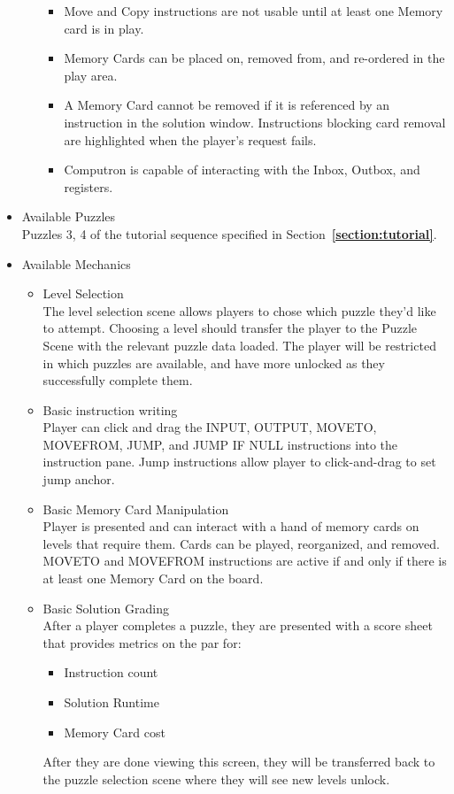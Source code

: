 \begin{itemize}
\begin{enumerate}
\begin{itemize}
			\item Move and Copy instructions are not usable until at least one 
			Memory card is in play.
			\item Memory Cards can be placed on, removed from, and re-ordered in 
			the play area.
			\item A Memory Card cannot be removed if it is referenced by an 
			instruction in the solution window. Instructions blocking card removal are 
			highlighted when the player's request fails.
			\item Computron is capable of interacting with the Inbox, Outbox, and registers.
		\end{itemize}
	\end{enumerate}
	\item Available Puzzles\\
	Puzzles 3, 4 of the tutorial sequence specified in Section~\textbf{\ref{section:tutorial}}.
	\item Available Mechanics
	\begin{itemize}
		\item Level Selection\\
		The level selection scene allows players to chose which puzzle they'd like to attempt. 
		Choosing a level should transfer the player to the Puzzle Scene with the relevant puzzle 
		data loaded. The player will be restricted in which puzzles are available, and have more unlocked as they successfully complete them.
		\item Basic instruction writing\\
		Player can click and drag the INPUT, OUTPUT, MOVETO, MOVEFROM, JUMP, and 
		JUMP IF NULL instructions into the instruction pane. Jump instructions allow player 
		to click-and-drag to set jump anchor.
		\item Basic Memory Card Manipulation\\
		Player is presented and can interact with a hand of memory cards on levels that require 
		them. Cards can be played, reorganized, and removed. MOVETO and MOVEFROM 
		instructions are active if and only if there is at least one Memory Card on the board.
		\item Basic Solution Grading\\
		After a player completes a puzzle, they are presented with a score sheet that provides 
		metrics on the par for:
		\begin{itemize}
			\item Instruction count
			\item Solution Runtime
			\item Memory Card cost
		\end{itemize}
		After they are done viewing this screen, they will be transferred back to the puzzle selection scene where they will see new levels unlock.
	\end{itemize}
\end{itemize}

